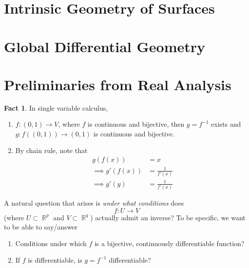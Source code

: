 \documentclass{amsart} %
\theoremstyle{mytheoremstyle}
\theoremstyle{definition}
\newtheorem{fact}[definition]{Fact}
\numberwithin{equation}{section}
\DeclareMathOperator{\R}{\mathbb{R}}
\DeclareMathOperator{\1}{\mathbbm{1}}
\begin{document}
\clearpage
\section{Intrinsic Geometry of Surfaces}







\clearpage
\section{Global Differential Geometry}







\clearpage

\appendix

\section{Preliminaries from Real Analysis}

\label{apppreliminaries}

\begin{fact}
	In single variable calculus,
	\begin{enumerate}[label=(\arabic*)]
		\item $f: (0,1) \to V$, where $f$ is continuous and bijective, then $g =f^{-1}$ exists and $g : f((0,1)) \to (0,1)$ is continuous and bijective.
		\item By chain rule, note that
		\begin{align*}
		g(f(x)) &= x \\
		\implies g'(f(x)) &= \frac{1}{f'(x)} \\
		\implies g'(y) &=  \frac{1}{f'(x)}
		\end{align*} 
	\end{enumerate}
\end{fact}

A natural question that arises is \textit{under what conditions} does 
$$f:U \to V$$
(where $U \subset \R^p $ and $V \subset \R^q$) actually admit an inverse? To be specific, we want to be able to say/answer
\begin{enumerate}[label=(\arabic*)]
	\item Conditions under which $f$ is a bijective, continuously differentiable function?
	\item If $f$ is differentiable, is $g=f^{-1}$ differentiable?
\end{enumerate}
\end{document}
